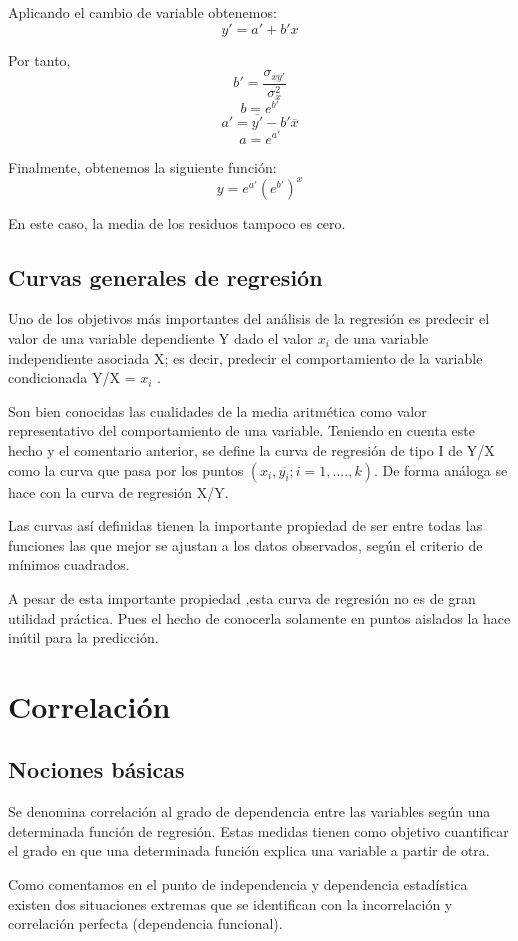 \documentclass{article}
\begin{document}
	Aplicando el cambio de variable obtenemos:
	$$ y' = a' + b'x $$
	
	Por tanto,
	$$ b' = \frac{\sigma_{xy'} }{\sigma_{x}^2} $$
	$$ b = e^{b'} $$
	$$ a' = \overline{y'} - b'\overline{x} $$
	$$ a = e^{a'} $$
	
	Finalmente, obtenemos la siguiente función:
	$$ y = e^{a'}(e^{b'})^{x} $$
	
	En este caso, la media de los residuos tampoco es cero.

\subsection{Curvas generales de regresión}
Uno de los objetivos más importantes del análisis de la regresión es predecir el valor de una variable dependiente Y dado el valor $x_i$ de una variable independiente asociada X;  es decir, predecir el comportamiento de la variable condicionada Y/X = $x_i$ .

Son bien conocidas las cualidades de la media aritmética como valor representativo del comportamiento de una variable. Teniendo en cuenta este hecho y el comentario anterior, se define la curva de regresión de tipo I de Y/X como la curva que pasa por los puntos $(x_i,\overline{y_i}; i = 1,....,k) $. De forma análoga se hace con la curva de regresión X/Y.

Las curvas así definidas tienen la importante propiedad de ser entre todas las funciones las que mejor se ajustan a los datos observados, según el criterio de mínimos cuadrados.

A pesar de esta importante propiedad ,esta curva de regresión no es de gran utilidad práctica. Pues el hecho de conocerla solamente en puntos aislados la hace inútil para la predicción.


\section{Correlación}
\subsection{Nociones básicas}

Se denomina correlación al grado de dependencia entre las variables según una determinada función de regresión. Estas medidas tienen como objetivo cuantificar el grado en que una determinada función explica una variable a partir de otra. 

Como comentamos en el punto de independencia y dependencia estadística existen dos situaciones extremas que se identifican con la incorrelación y correlación perfecta (dependencia funcional).
\end{document}
